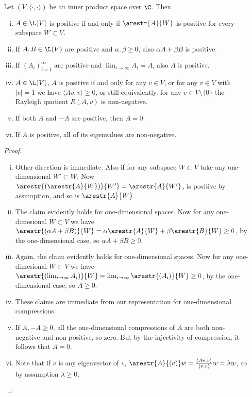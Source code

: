 \begin{prop}\label{basic_positive}
	Let $(V, \langle \cdot, \cdot \rangle)$ be an inner product space over $\C$. Then
	\begin{enumerate}[(i)]
		\item $A \in \L(V)$ is positive if and only if $\arestr{A}{W}$ is positive for every subspace $W \subset V$.
		\item If $A, B \in \L(V)$ are positive and $\alpha, \beta \geq 0$, also $\alpha A + \beta B$ is positive.
		\item If $(A_{i})_{i = 1}^{\infty}$ are positive and $\lim_{i \to \infty} A_{i} = A$, also $A$ is positive.
		\item $A \in \L(V)$, $A$ is positive if and only for any $v \in V$, or for any $v \in V$ with $|v| = 1$ we have $\langle A v, v \rangle \geq 0$, or still equivalently, for any $v \in V \setminus \{0\}$ the Rayleigh quotient $R(A, v)$ is non-negative.
		\item If both $A$ and $-A$ are positive, then $A = 0$.
		\item If $A$ is positive, all of its eigenvalues are non-negative.
	\end{enumerate}
\end{prop}
\begin{proof}
	\begin{enumerate}[(i)]
		\item Other direction is immediate. Also if for any subspace $W \subset V$ take any one-dimensional $W' \subset W$. Now $\arestr{(\arestr{A}{W})}{W'} = \arestr{A}{W'}$, is positive by assumption, and so is $\arestr{A}{W}$.
		\item The claim evidently holds for one-dimensional spaces. Now for any one-dimesional $W \subset V$ we have $\arestr{(\alpha A + \beta B)}{W} = \alpha \arestr{A}{W} + \beta \arestr{B}{W} \geq 0$, by the one-dimensional case, so $\alpha A + \beta B \geq 0$.
		\item Again, the claim evidently holds for one-dimensional spaces. Now for any one-dimesional $W \subset V$ we have $\arestr{(\lim_{i \to \infty} A_{i})}{W} = \lim_{i \to \infty}\arestr{(A_{i})}{W}\geq 0$, by the one-dimensional case, so $A \geq 0$.
		\item These claims are immediate from our representation for one-dimensional compressions.
		\item If $A, -A \geq 0$, all the one-dimensional compressions of $A$ are both non-negative and non-positive, so zero. But by the injectivity of compression, it follows that $A = 0$.
		\item Note that if $v$ is any eigenvector of $v$, $\arestr{A}{(v)} w = \frac{\langle A v, v\rangle}{\langle v, v\rangle} w = \lambda w$, so by assumption $\lambda \geq 0$.
	\end{enumerate}
\end{proof}


